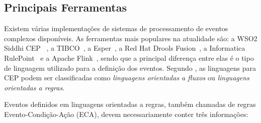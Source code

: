




\subsection{Principais Ferramentas}
\label{sec:mainsoftwares}

Existem várias implementações de sistemas de processamento de eventos complexos disponíveis. As ferramentas mais populares na atualidade são: a WSO2 Siddhi CEP ~\citep{WSO2}, a TIBCO~\citep{TIBCO},  a Esper~\citep{ESPER}, a Red Hat Drools Fusion~\citep{DroolsFusion}, a Informatica RulePoint~\citep{Informatica} e a Apache Flink~\citep{Flink}, sendo que a principal diferença entre elas é o tipo de linguagem utilizado para a definição dos eventos. Segundo \cite{Margara:2011:PFI:2002259.2002307}, as linguagens para CEP podem ser classificadas como \textit{linguagens orientadas a fluxos} ou \textit{linguagens orientadas a regras}. 

Eventos definidos em linguagens orientadas a regras, também chamadas de regras Evento-Condição-Ação (ECA), devem necessariamente conter três informações:

